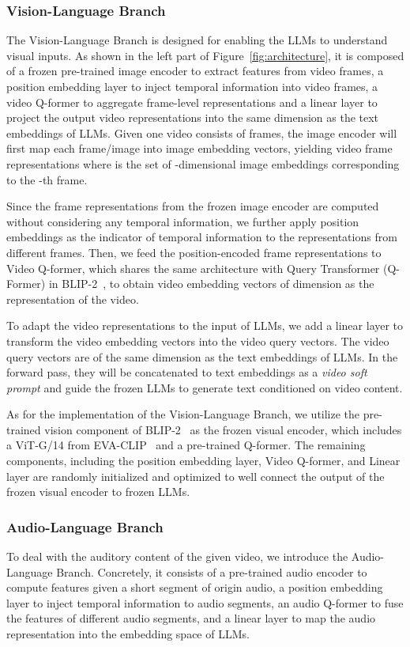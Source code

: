 \documentclass[11pt]{article}
\begin{document}
\subsubsection{Vision-Language Branch} 
The Vision-Language Branch is designed for enabling the LLMs to understand visual inputs. As shown in the left part of Figure~\ref{fig:architecture}, it is composed of a frozen pre-trained image encoder to extract features from video frames, a position embedding layer to inject temporal information into video frames, a video Q-former to aggregate frame-level representations and a linear layer to project the output video representations into the same dimension as the text embeddings of LLMs. Given one video consists of  frames, the image encoder will first map each frame/image into  image embedding vectors, yielding video frame representations  where  is the set of -dimensional image embeddings  corresponding to the -th frame.  

Since the frame representations  from the frozen image encoder are computed without considering any temporal information, we further apply position embeddings as the indicator of temporal information to the representations from different frames. Then, we feed the position-encoded frame representations to Video Q-former, which shares the same architecture with Query Transformer (Q-Former) in BLIP-2~\citep{li2023blip2bl}, to obtain  video embedding vectors of dimension  as the representation  of the video.

To adapt the video representations to the input of LLMs, we add a linear layer to transform the video embedding vectors into the video query vectors. The video query vectors are of the same dimension as the text embeddings of LLMs. In the forward pass, they will be concatenated to text embeddings as a \textit{video soft prompt} and guide the frozen LLMs to generate text conditioned on video content.

As for the implementation of the Vision-Language Branch, we utilize the pre-trained vision component of BLIP-2~\citep{li2023blip2bl} as the frozen visual encoder, which includes a ViT-G/14 from EVA-CLIP~\citep{fang2022eva} and a pre-trained Q-former. The remaining components, including the position embedding layer, Video Q-former, and Linear layer are randomly initialized and optimized to well connect the output of the frozen visual encoder to frozen LLMs.

\subsubsection{Audio-Language Branch}
To deal with the auditory content of the given video, we introduce the Audio-Language Branch. Concretely, it consists of a pre-trained audio encoder to compute features given a short segment of origin audio, a position embedding layer to inject temporal information to audio segments, an audio Q-former to fuse the features of different audio segments, and a linear layer to map the audio representation into the embedding space of LLMs.
\end{document}
